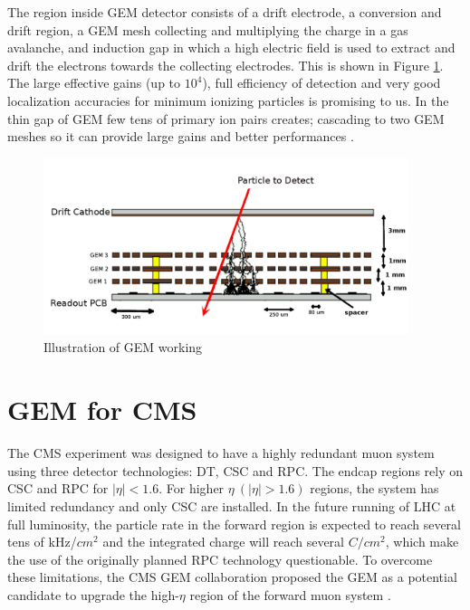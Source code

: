 The region inside GEM detector consists of a drift electrode, a conversion and drift region, a GEM mesh collecting and multiplying the charge in a gas avalanche, and induction gap in which a high electric field is used to extract and drift the electrons towards the collecting electrodes. This is shown in Figure \ref{fig:gemgaps}. The large effective gains (up to $10^4$), full efficiency of detection and very good localization accuracies for minimum ionizing particles is promising to us. In the thin gap of GEM few tens of primary ion pairs creates; cascading to two GEM meshes so it can provide large gains and better performances \cite{Bressan1999}.
\begin{figure}[!htbp]
	\begin{center}
		\includegraphics[width=0.95\textwidth]{figures/GEM/triple_gem.png}
		\caption{Illustration of GEM working}
		\label{fig:gemgaps}
	\end{center}
\end{figure} 

\section{GEM for CMS}
The CMS experiment was designed to have a highly redundant muon system using three detector technologies: DT, CSC and RPC. The endcap regions rely on CSC and RPC for $|\eta|<1.6$. For higher $\eta~ (|\eta|>1.6)$ regions, the system has limited redundancy and only CSC are installed. In the future running of LHC at full luminosity, the particle rate in the forward region is expected to reach several tens of kHz/$cm^2$ and the integrated charge will reach several $C/cm^2$, which make the use of the originally planned RPC technology questionable. To overcome these limitations, the CMS GEM collaboration proposed the GEM as a potential candidate to upgrade the high-$\eta$ region of the forward muon system \cite{Colaleo:2021453}. 

